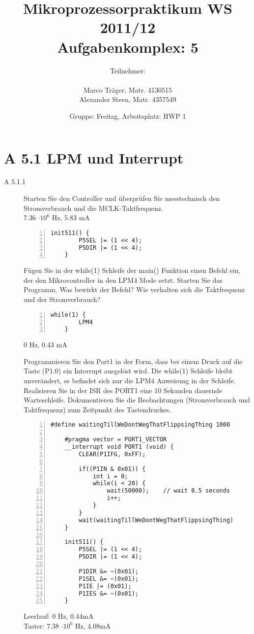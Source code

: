 \documentclass[11pt,a4paper,ngerman]{article}
\author{Teilnehmer:\\ \\Marco Träger, Matr. 4130515\\Alexander Steen, Matr. 4357549}
\date{Gruppe: Freitag, Arbeitsplatz: HWP 1}
\title{Mikroprozessorpraktikum WS 2011/12\\ Aufgabenkomplex: 5}
\begin{document}

\maketitle
\thispagestyle{fancy}
\newpage
\section*{A 5.1 LPM und Interrupt}

\begin{description}
	\item[A 5.1.1] Starten Sie den Controller und überprüfen Sie messtechnisch den Stromverbrauch und die MCLK-Taktfrequenz. \\
	
	7.36 $\cdot 10^6$ Hz, 5.83 mA
	
	\begin{lstlisting}[numbers=left]
	init511() {
		P5SEL |= (1 << 4);
		P5DIR |= (1 << 4);
	}
	\end{lstlisting}
	
	Fügen Sie in der while(1) Schleife der main() Funktion einen Befehl ein, der den Mikrocontroller in den LPM4 Mode setzt. Starten Sie das Programm. 
	Was bewirkt der Befehl? Wie verhalten sich die Taktfrequenz und der Stromverbrauch? \\
	
	\begin{lstlisting}[numbers=left]
	while(1) {
		LPM4
	}
	\end{lstlisting}
	
	0 Hz, 0.43 mA
	
	Programmieren Sie den Port1 in der Form, dass bei einem Druck auf die Taste (P1.0) ein Interrupt ausgelöst wird. Die while(1) Schleife bleibt unverändert, es 
	befindet sich nur die LPM4 Anweisung in der Schleife. Realisieren Sie in der ISR des PORT1 eine 10 Sekunden dauernde Warteschleife.
	Dokumentieren Sie die Beobachtungen (Stromverbrauch und Taktfrequenz) zum Zeitpunkt des Tastendruckes. 
	
	\begin{lstlisting}[numbers=left]
	#define waitingTillWeDontWegThatFlippsingThing 1000
	
	#pragma vector = PORT1_VECTOR
	__interrupt void PORT1 (void) {
		CLEAR(P1IFG, 0xFF);

		if((P1IN & 0x01)) {
			int i = 0;
			while(i < 20) {
				wait(50000);	// wait 0.5 seconds
				i++;
			}
		}
		wait(waitingTillWeDontWegThatFlippsingThing)
	}
	
	init511() {
		P5SEL |= (1 << 4);
		P5DIR |= (1 << 4);
		
		P1DIR &= ~(0x01);
		P1SEL &= ~(0x01);
		P1IE |= (0x01);
		P1IES &= ~(0x01);
	}
	\end{lstlisting}
	
	Leerlauf: 0 Hz, 0.44mA \\
	Taster: 7.38 $\cdot 10^6$ Hz, 4.08mA
\end{description}
\end{document}
